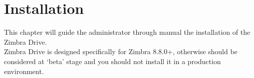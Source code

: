 \chapter{Installation}

This chapter will guide the administrator through manual the installation of the Zimbra Drive.\\
Zimbra Drive is designed specifically for Zimbra 8.8.0+, otherwise should be considered at `beta'
stage and you should not install it in a production environment.




